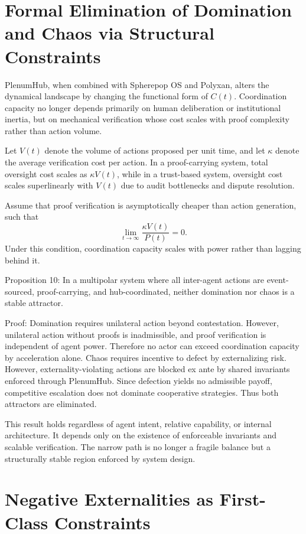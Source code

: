\documentclass[11pt,oneside]{article}
\begin{document}
\section{Formal Elimination of Domination and Chaos via Structural Constraints}

PlenumHub, when combined with Spherepop OS and Polyxan, alters the dynamical landscape by changing the functional form of \( C(t) \). Coordination capacity no longer depends primarily on human deliberation or institutional inertia, but on mechanical verification whose cost scales with proof complexity rather than action volume.

Let \( V(t) \) denote the volume of actions proposed per unit time, and let \( \kappa \) denote the average verification cost per action. In a proof-carrying system, total oversight cost scales as \( \kappa V(t) \), while in a trust-based system, oversight cost scales superlinearly with \( V(t) \) due to audit bottlenecks and dispute resolution.

Assume that proof verification is asymptotically cheaper than action generation, such that
\[
\lim_{t \to \infty} \frac{\kappa V(t)}{P(t)} = 0.
\]
Under this condition, coordination capacity scales with power rather than lagging behind it.

Proposition 10: In a multipolar system where all inter-agent actions are event-sourced, proof-carrying, and hub-coordinated, neither domination nor chaos is a stable attractor.

Proof: Domination requires unilateral action beyond contestation. However, unilateral action without proofs is inadmissible, and proof verification is independent of agent power. Therefore no actor can exceed coordination capacity by acceleration alone. Chaos requires incentive to defect by externalizing risk. However, externality-violating actions are blocked ex ante by shared invariants enforced through PlenumHub. Since defection yields no admissible payoff, competitive escalation does not dominate cooperative strategies. Thus both attractors are eliminated.

This result holds regardless of agent intent, relative capability, or internal architecture. It depends only on the existence of enforceable invariants and scalable verification. The narrow path is no longer a fragile balance but a structurally stable region enforced by system design.

\section{Negative Externalities as First-Class Constraints}
\end{document}
